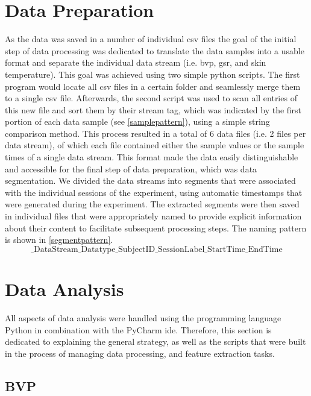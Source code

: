 \section{Data Preparation}
As the data was saved in a number of individual csv files the goal of the initial step of data processing was dedicated to translate the data samples into a usable format and separate the individual data stream (i.e. \gls{bvp}, \gls{gsr}, and skin temperature). This goal was achieved using two simple python scripts. The first program would locate all csv files in a certain folder and seamlessly merge them to a single csv file. Afterwards, the second script was used to scan all entries of this new file and sort them by their stream tag, which was indicated by the first portion of each data sample (see \ref{samplepattern}), using a simple string comparison method. This process resulted in a total of 6 data files (i.e. 2 files per data stream), of which each file contained either the sample values or the sample times of a single data stream. This format made the data easily distinguishable and accessible for the final step of data preparation, which was data segmentation. We divided the data streams into segments that were associated with the individual sessions of the experiment, using automatic timestamps that were generated during the experiment. The extracted segments were then saved in individual files that were appropriately named to provide explicit information about their content to facilitate subsequent processing steps. The naming pattern is shown in \ref{segmentpattern}.
\begin{equation}\label{segmentpattern}
\text{\_DataStream\_Datatype\_SubjectID\_SessionLabel\_StartTime\_EndTime}
\end{equation}

\section{Data Analysis}
All aspects of data analysis were handled using the programming language Python in combination with the PyCharm \gls{ide}. Therefore, this section is dedicated to explaining the general strategy, as well as the scripts that were built in the process of managing data processing, and feature extraction tasks.

\subsection{BVP}

